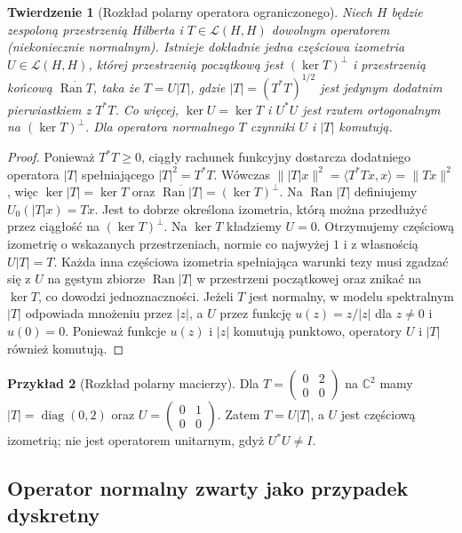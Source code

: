 \documentclass[11pt,a4paper]{article}
\numberwithin{equation}{section}
\theoremstyle{plain}
\newtheorem{twierdzenie}{Twierdzenie}[section]
\theoremstyle{definition}
\newtheorem{przyklad}[twierdzenie]{Przykład}
\theoremstyle{remark}
\newcommand{\C}{\mathbb C}
\begin{document}
\begin{twierdzenie}[Rozkład polarny operatora ograniczonego]
\label{thm:polar-decomp32}
Niech $H$ będzie zespoloną przestrzenią Hilberta i
$T\in\mathcal L(H,H)$ dowolnym operatorem (niekoniecznie normalnym).
Istnieje dokładnie jedna \emph{częściowa izometria}
$U\in\mathcal L(H,H)$, której przestrzenią początkową jest
$(\ker T)^\perp$ i przestrzenią końcową
$\overline{\operatorname{Ran}T}$, taka że
$T=U|T|$, gdzie $|T|=(T^*T)^{1/2}$ jest jedynym dodatnim
pierwiastkiem z $T^*T$. Co więcej, $\ker U=\ker T$
i $U^*U$ jest rzutem ortogonalnym na $(\ker T)^\perp$.
Dla operatora normalnego $T$ czynniki $U$ i $|T|$ komutują.
\end{twierdzenie}
\begin{proof}
Ponieważ $T^*T\ge0$, ciągły rachunek funkcyjny
dostarcza dodatniego operatora $|T|$ spełniającego
$|T|^2=T^*T$. Wówczas
$\||T|x\|^2=\langle T^*Tx,x\rangle=\|Tx\|^2$, więc
$\ker|T|=\ker T$ oraz
$\overline{\operatorname{Ran}|T|}=(\ker T)^\perp$.
Na $\operatorname{Ran}|T|$ definiujemy $U_0(|T|x)=Tx$.
Jest to dobrze określona izometria, którą można przedłużyć
przez ciągłość na $(\ker T)^\perp$.
Na $\ker T$ kładziemy $U=0$. Otrzymujemy częściową
izometrię o wskazanych przestrzeniach, normie co najwyżej $1$
i z własnością $U|T|=T$.
Każda inna częściowa izometria spełniająca warunki tezy
musi zgadzać się z $U$ na gęstym zbiorze
$\operatorname{Ran}|T|$ w przestrzeni początkowej oraz znikać
na $\ker T$, co dowodzi jednoznaczności.
Jeżeli $T$ jest normalny, w modelu spektralnym
$|T|$ odpowiada mnożeniu przez $|z|$, a $U$ przez
funkcję $u(z)=z/|z|$ dla $z\ne0$ i $u(0)=0$.
Ponieważ funkcje $u(z)$ i $|z|$ komutują punktowo,
operatory $U$ i $|T|$ również komutują.
\end{proof}

\begin{przyklad}[Rozkład polarny macierzy]
Dla $T=\left(\begin{smallmatrix}0&2\\0&0\end{smallmatrix}\right)$
na $\C^2$ mamy
$|T|=\operatorname{diag}(0,2)$ oraz
$U=\left(\begin{smallmatrix}0&1\\0&0\end{smallmatrix}\right)$.
Zatem $T=U|T|$, a $U$ jest częściową izometrią;
nie jest operatorem unitarnym, gdyż $U^*U\ne I$.
\end{przyklad}

\subsection{Operator normalny zwarty jako przypadek dyskretny}
\end{document}
